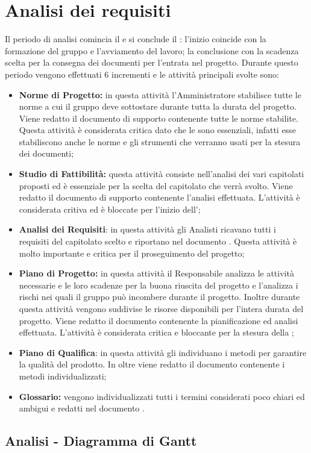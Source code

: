 \documentclass[PianoDiProgetto.tex]{subfiles}
\begin{document}
\section{Analisi dei requisiti}
Il periodo di analisi comincia il  e si conclude il : l'inizio coincide con la formazione del gruppo e l'avviamento del lavoro; la conclusione con la scadenza scelta per la consegna dei documenti per l'entrata nel progetto. Durante questo periodo vengono effettuati 6 incrementi e le attività principali svolte sono:
\begin{itemize}
	\item \textbf{Norme di Progetto:}
	in questa attività l'Amministratore stabilisce tutte le norme a cui il gruppo \gruppo deve sottostare durante tutta la durata del progetto. Viene redatto il documento di supporto \ndp contenente tutte le norme stabilite. Questa attività è considerata critica dato che le \ndp sono essenziali, infatti esse stabiliscono anche le norme e gli strumenti che verranno usati per la stesura dei documenti;
	
	
	\item \textbf{Studio di Fattibilità:} 
	questa attività consiste nell'analisi dei vari capitolati proposti ed è essenziale per la scelta del capitolato che verrà svolto. Viene redatto il documento di supporto \sdf contenente l'analisi effettuata. L'attività è considerata critiva ed è bloccate per l'inizio dell'\adr;
		
	\item \textbf{Analisi dei Requisiti}: 
		in questa attività gli Analisti ricavano tutti i requisiti del capitolato scelto e riportano nel documento \adr. Questa attività è molto importante e critica per il proseguimento del progetto;
	
	\item \textbf{Piano di Progetto:} in questa attività il Responsabile analizza le attività necessarie e le loro scadenze per la buona riuscita del progetto e l'\amme analizza i rischi nei quali il gruppo \gruppo può incombere durante il progetto.  Inoltre durante questa attività vengono suddivise le risorse disponibili per l'intera durata del progetto. Viene redatto il documento \pdp contenente la pianificazione ed analisi effettuata. L'attività è considerata critica e bloccante per la stesura della ;
	\item \textbf{Piano di Qualifica}: in questa attività gli \ammi individuano i metodi per garantire la qualità del prodotto. In oltre viene redatto il documento \pdq contenente i metodi individualizzati;
	\item \textbf{Glossario:} vengono individualizzati tutti i termini considerati poco chiari ed ambigui e redatti nel documento \g.
		
\end{itemize}	 
\begin{landscape}
\subsection{Analisi - Diagramma di Gantt}
\end{landscape}	
\end{document}
